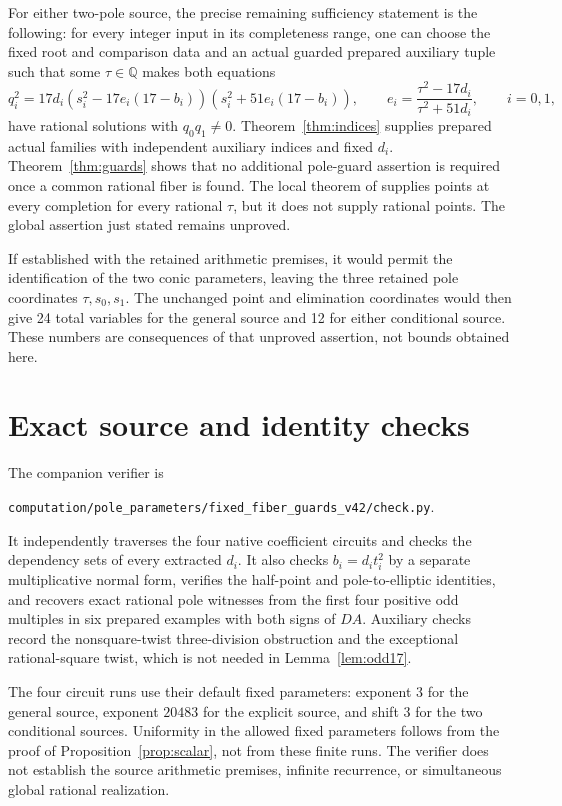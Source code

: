 \documentclass[11pt,a4paper]{article}
\theoremstyle{remark}\newtheorem{remark}[theorem]{Remark}
\newcommand{\Q}{\mathbb Q}\newcommand{\Z}{\mathbb Z}
\begin{document}
For either two-pole source, the precise remaining sufficiency statement
is the following: for every integer input in its completeness range,
one can choose the fixed root and comparison data and an actual guarded
prepared auxiliary tuple such that some $\tau\in\Q$ makes both
equations
\[
 q_i^2=17d_i\left(s_i^2-17e_i(17-b_i)\right)
                   \left(s_i^2+51e_i(17-b_i)\right),\qquad
 e_i=\frac{\tau^2-17d_i}{\tau^2+51d_i},\qquad i=0,1,
\]
have rational solutions with $q_0q_1\ne0$.
Theorem~\ref{thm:indices} supplies prepared actual families with
independent auxiliary indices and fixed $d_i$.
Theorem~\ref{thm:guards} shows that no additional pole-guard
assertion is required once a common rational fiber is found.
The local theorem of \cite{Local} supplies points at every completion
for every rational $\tau$, but it does not supply rational points.
The global assertion just stated remains unproved.

If established with the retained arithmetic premises, it would permit
the identification of the two conic parameters, leaving the three
retained pole coordinates $\tau,s_0,s_1$. The unchanged point and
elimination coordinates would then give 24 total variables for the
general source and 12 for either conditional source. These numbers are
consequences of that unproved assertion, not bounds obtained here.

\newpage
\section{Exact source and identity checks}

The companion verifier is
\begin{center}\small
\texttt{computation/pole\_parameters/fixed\_fiber\_guards\_v42/check.py}.
\end{center}
It independently traverses the four native coefficient circuits and
checks the dependency sets of every extracted $d_i$. It also checks
$b_i=d_it_i^2$ by a separate multiplicative normal form, verifies
the half-point and pole-to-elliptic identities, and recovers exact
rational pole witnesses from the first four positive odd multiples
in six prepared examples with both signs of $DA$. Auxiliary checks
record the nonsquare-twist three-division obstruction and the
exceptional rational-square twist, which is not needed in
Lemma~\ref{lem:odd17}.

The four circuit runs use their default fixed parameters: exponent
$3$ for the general source, exponent $20483$ for the explicit source,
and shift $3$ for the two conditional sources. Uniformity in the
allowed fixed parameters follows from the proof of
Proposition~\ref{prop:scalar}, not from these finite runs. The verifier
does not establish the source arithmetic premises, infinite recurrence,
or simultaneous global rational realization.
\end{document}
